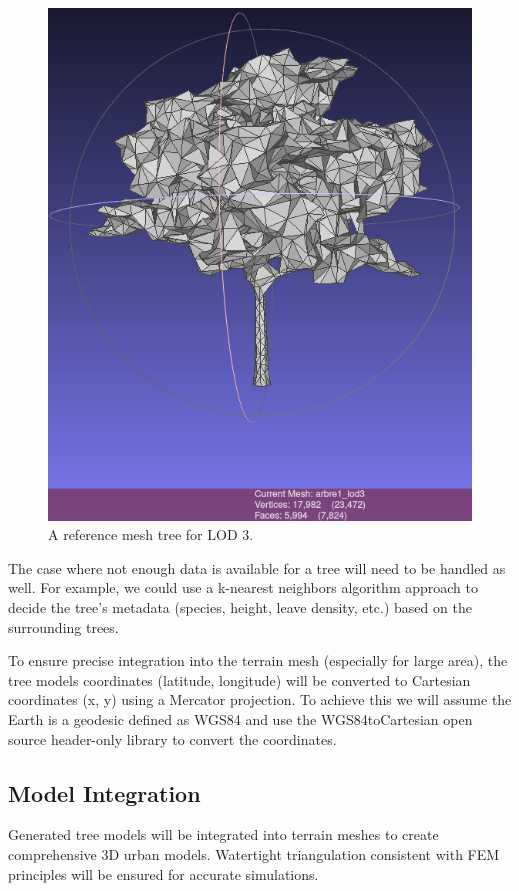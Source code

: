 \documentclass[12pt]{article}
\begin{document}
\begin{figure}[H]
\begin{minipage}{0.45\textwidth}
        \includegraphics[width=\textwidth]{images/lod3.png}
        \caption{A reference mesh tree for LOD 3.}
    \end{minipage}
\end{figure}

The case where not enough data is available for a tree will need to be handled
as well. For example, we could use a k-nearest neighbors algorithm \cite{k-NN} approach to
decide the tree's metadata (species, height, leave density, etc.) based on the
surrounding trees.

To ensure precise integration into the terrain mesh (especially for large area), the tree models coordinates
(latitude, longitude) will be converted to Cartesian coordinates (x, y) using
a Mercator projection. To achieve this we will assume the Earth is a geodesic
defined as WGS84 \cite{wgs84} and use the WGS84toCartesian\cite{wgs84_to_cartesian} open source header-only
  library to convert the coordinates.

\subsection{Model Integration}
Generated tree models will be integrated into terrain meshes to create comprehensive 
3D urban models. Watertight triangulation consistent with FEM principles will be ensured 
for accurate simulations.
\end{document}
